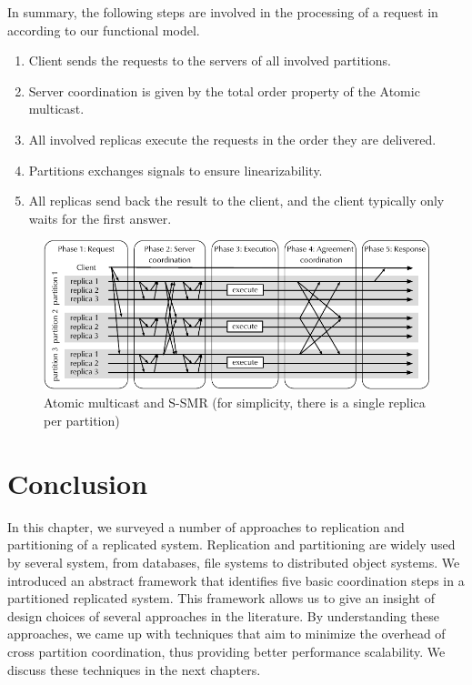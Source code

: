 In summary, the following steps are involved in the processing of a request in
\ssmr\, according to our functional model.

\begin{enumerate}
  \item Client sends the requests to the servers of all involved partitions.
  \item Server coordination is given by the total order property of the Atomic
  multicast.
  \item All involved replicas execute the requests in the order they are delivered.
  \item Partitions exchanges signals to ensure linearizability.
  \item All replicas send back the result to the client, and the client
  typically only waits for the first answer.
\end{enumerate}

\begin{figure}
  \begin{minipage}[b]{1.0\linewidth}
  \centering
        \includegraphics[width=1\linewidth]{figures/coordination-ssmr}
  \end{minipage}
  \caption{Atomic multicast and S-SMR (for simplicity, there is a single replica per partition)}
  \label{fig:coordination-ssmr}
\end{figure}

\section{Conclusion}

In this chapter, we surveyed a number of approaches to replication and
partitioning of a replicated system. Replication and partitioning are widely used
by several system, from databases, file systems to distributed object systems.
We introduced an abstract framework that identifies five basic coordination
steps in a partitioned replicated system. This framework allows us to give an
insight of design choices of several approaches in the literature. By
understanding these approaches, we came up with techniques that aim to
minimize the overhead of cross partition coordination, thus providing better
performance scalability.
We discuss these techniques in the next chapters.













